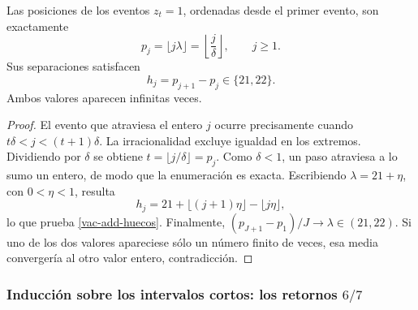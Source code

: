 \begin{theorem}
\label{vac-add-teorema-primario}
Las posiciones de los eventos \(z_t=1\), ordenadas desde el primer
evento, son exactamente
\begin{equation}
 p_j=\lfloor j\lambda\rfloor
     =\left\lfloor\frac j\delta\right\rfloor,
 \qquad j\geq1.
 \label{vac-add-posiciones}
\end{equation}
Sus separaciones satisfacen
\begin{equation}
 h_j=p_{j+1}-p_j\in\{21,22\}.
 \label{vac-add-huecos}
\end{equation}
Ambos valores aparecen infinitas veces.
\end{theorem}
\begin{proof}
El evento que atraviesa el entero \(j\) ocurre precisamente cuando
\(t\delta<j<(t+1)\delta\). La irracionalidad excluye igualdad en
los extremos. Dividiendo por \(\delta\) se obtiene
\(t=\lfloor j/\delta\rfloor=p_j\). Como \(\delta<1\), un paso
atraviesa a lo sumo un entero, de modo que la enumeración es exacta.
Escribiendo \(\lambda=21+\eta\), con \(0<\eta<1\), resulta
\[
 h_j=21+\lfloor(j+1)\eta\rfloor-\lfloor j\eta\rfloor,
\]
lo que prueba \eqref{vac-add-huecos}. Finalmente,
\((p_{J+1}-p_1)/J\to\lambda\in(21,22)\). Si uno de los dos valores
apareciese sólo un número finito de veces, esa media convergería al
otro valor entero, contradicción.
\end{proof}

\subsubsection{Inducción sobre los intervalos cortos: los retornos \(6/7\)}
\label{vac-add-secundarios}

